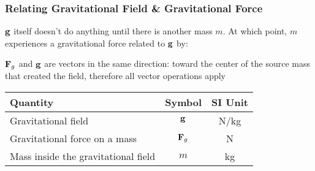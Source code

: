\documentclass[12pt,compress,aspectratio=169]{beamer}
\newcommand{\mb}[1]{\ensuremath\mathbf{#1}}
\begin{document}
\begin{frame}
  \frametitle{Relating Gravitational Field \& Gravitational Force}

  $\mb{g}$ itself doesn't do anything until there is another mass $m$. At which
  point, $m$ experiences a gravitational force  related to $\mb{g}$ by:

  \vspace{-0.2in}{\Large
    \begin{displaymath}
      \boxed{\mb{g}=\frac{\mb{F}_g}{m}}
    \end{displaymath}
  }
  
  $\mb{F}_g$ and  $\mb{g}$ are vectors in the same direction: toward the
  center of the source mass that created the field, therefore all vector
  operations apply

  \begin{center}
    \begin{tabular}{l|c|c}
      \rowcolor{pink}
      \textbf{Quantity} & \textbf{Symbol} & \textbf{SI Unit} \\ \hline
      Gravitational field & $\mb{g}$   & \si{N/kg}\\
      Gravitational force on a mass & $\mb{F}_g$ & \si{N} \\
      Mass inside the gravitational field & $m$ & \si{kg} \\
    \end{tabular}
  \end{center}
\end{frame}
\end{document}
